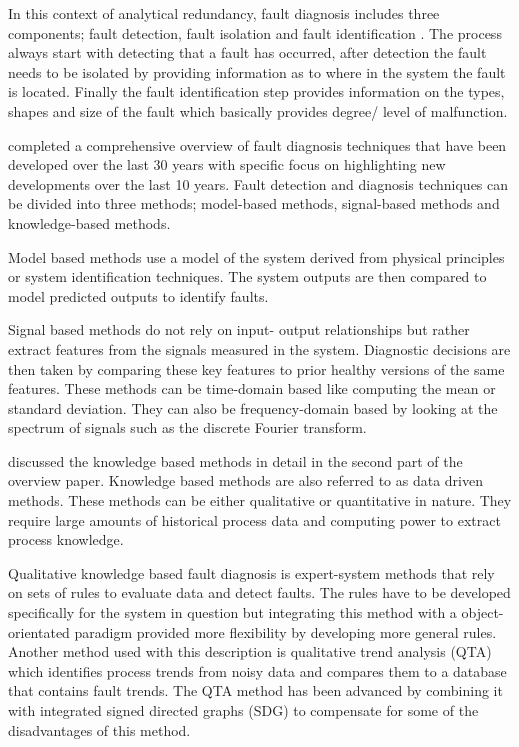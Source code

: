 In this context of analytical redundancy, fault diagnosis includes three components; fault detection, fault isolation and fault identification \cite{gao2015survey}. The process always start with detecting that a fault has occurred, after detection the fault needs to be isolated by providing information as to where in the system the fault is located. Finally the fault identification step provides information on the types, shapes and size of the fault which basically provides degree/ level of malfunction.

\cite{gao2015survey} completed a comprehensive overview of fault diagnosis techniques that have been developed over the last 30 years with specific focus on highlighting new developments over the last 10 years. Fault detection and diagnosis techniques can be divided into three methods; model-based methods, signal-based methods and knowledge-based methods.

Model based methods use a model of the system derived from physical principles or system identification techniques. The system outputs are then compared to model predicted outputs to identify faults.

Signal based methods do not rely on input- output relationships but rather extract features from the signals measured in the system. Diagnostic decisions are then taken by comparing these key features to prior healthy versions of the same features. These methods can be time-domain based like computing the mean or standard deviation. They can also be frequency-domain based by looking at the spectrum of signals such as the discrete Fourier transform.

\cite{cecati2015survey} discussed the knowledge based methods in detail in the second part of the overview paper. Knowledge based methods are also referred to as data driven methods. These methods can be either qualitative or quantitative in nature. They require large amounts of historical process data and computing power to extract process knowledge. 

Qualitative knowledge based fault diagnosis is expert-system methods that rely on sets of rules to evaluate data and detect faults. The rules have to be developed specifically for the system in question but integrating this method with a object-orientated paradigm provided more flexibility by developing more general rules. Another method used with this description is qualitative trend analysis (QTA) which identifies process trends from noisy data and compares them to a database that contains fault trends. The QTA method has been advanced by combining it with integrated signed directed graphs (SDG) to compensate for some of the disadvantages of this method.

